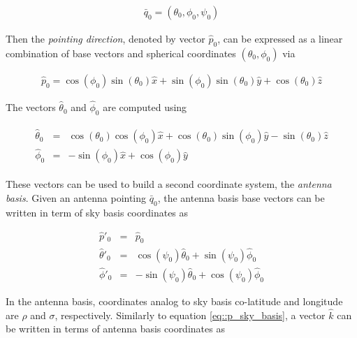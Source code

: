\documentclass[a4paper,11pt]{article}
\begin{document}
\begin{equation}
\begin{aligned}
\bar{q}_0= (\theta_0,\phi_0,\psi_0)
\end{aligned}
\end{equation}

Then the \textsl{pointing direction}, denoted by vector $\hat{p}_0$, can be expressed as a linear combination of base vectors and spherical coordinates $(\theta_0,\phi_0)$ via

\begin{equation}
\begin{aligned}
\hat{p}_0 = \cos(\phi_0)\sin(\theta_0)\hat{x} + \sin(\phi_0)\sin(\theta_0) \hat{y} + \cos(\theta_0) \hat{z}
\end{aligned}
\label{eq::p_sky_basis}
\end{equation}

The vectors $\hat{\theta}_0$ and $\hat{\phi}_0$ are computed using

\begin{eqnarray}
\begin{aligned}
\hat{\theta}_0 &=&  \cos(\theta_0) \cos(\phi_0) \hat{x} + \cos(\theta_0)\sin(\phi_0) \hat{y} - \sin(\theta_0) \hat{z} \\
\hat{\phi}_0   &=&              -\sin(\phi_0) \hat{x} +             \cos(\phi_0) \hat{y}
\end{aligned}
\label{eq::tangent_sky_basis}
\end{eqnarray}

These vectors can be used to build a second coordinate system, the \textsl{antenna basis}. Given an antenna pointing $\bar{q}_0$, the antenna basis base vectors can be written in term of sky basis coordinates as 

\begin{eqnarray}
\hat{p}'_0      &=&  \hat{p}_0 \\
\hat{\theta}'_0 &=&  \cos(\psi_0)\hat{\theta}_0 + \sin(\psi_0)\hat{\phi}_0 \\
\hat{\phi}'_0   &=& -\sin(\psi_0)\hat{\theta}_0 + \cos(\psi_0)\hat{\phi}_0
\label{eq::antenna_base_vectors}
\end{eqnarray}

In the antenna basis, coordinates analog to sky basis co-latitude and longitude are $\rho$ and $\sigma$, respectively. Similarly to equation \ref{eq::p_sky_basis}, a vector $\hat{k}$ can be written in terms of antenna basis coordinates as
\end{document}

